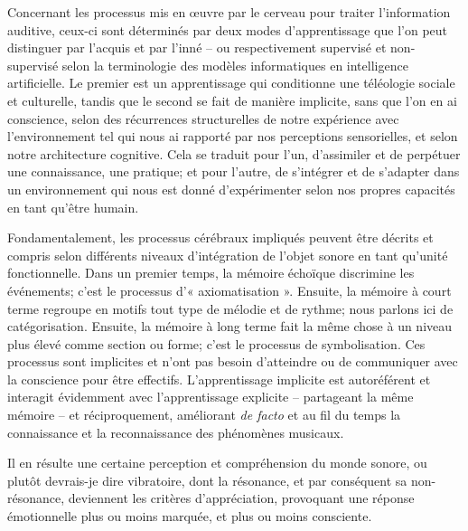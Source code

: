\documentclass{article}
\begin{document}
Concernant les processus mis en œuvre par le cerveau pour traiter l'information auditive, ceux-ci sont déterminés par deux modes d'apprentissage que l'on peut distinguer par l'acquis et par l'inné -- ou respectivement supervisé et non-supervisé selon la terminologie des modèles informatiques en intelligence artificielle. Le premier est un apprentissage qui conditionne une téléologie sociale et culturelle, tandis que le second se fait de manière implicite, sans que l'on en ai conscience, selon des récurrences structurelles de notre expérience avec l'environnement tel qui nous ai rapporté par nos perceptions sensorielles, et selon notre architecture cognitive. Cela se traduit pour l'un, d'assimiler et de perpétuer une connaissance, une pratique; et pour l'autre, de s'intégrer et de s'adapter dans un environnement qui nous est donné d'expérimenter selon nos propres capacités en tant qu'être humain.

Fondamentalement, les processus cérébraux impliqués peuvent être décrits et compris selon différents niveaux d'intégration de l'objet sonore en tant qu'unité fonctionnelle. Dans un premier temps, la mémoire échoïque discrimine les événements; c'est le processus d'« axiomatisation ». Ensuite, la mémoire à court terme regroupe en motifs tout type de mélodie et de rythme; nous parlons ici de catégorisation. Ensuite, la mémoire à long terme fait la même chose à un niveau plus élevé comme section ou forme; c'est le processus de symbolisation. Ces processus sont implicites et n'ont pas besoin d'atteindre ou de communiquer avec la conscience pour être effectifs. L'apprentissage implicite est autoréférent et interagit évidemment avec l'apprentissage explicite -- partageant la même mémoire -- et réciproquement, améliorant \textit{de facto} et au fil du temps la connaissance et la reconnaissance des phénomènes musicaux.

Il en résulte une certaine perception et compréhension du monde sonore, ou plutôt devrais-je dire vibratoire, dont la résonance, et par conséquent sa non-résonance, deviennent les critères d'appréciation, provoquant une réponse émotionnelle plus ou moins marquée, et plus ou moins consciente.

\bigskip
\end{document}
